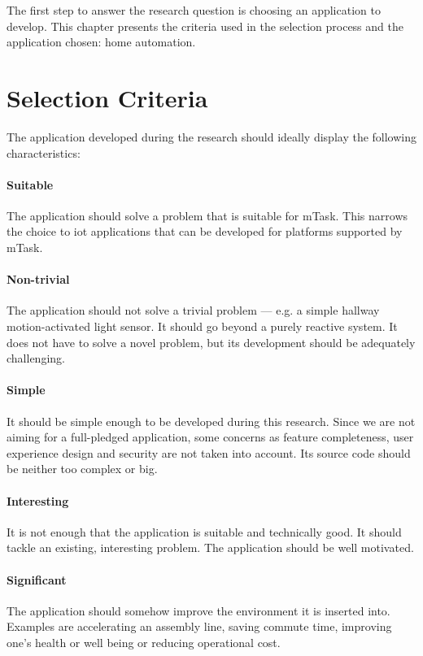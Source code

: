 The first step to answer the research question is choosing an application to develop. This chapter presents the criteria used in the selection process and the application chosen: home automation.

\section{Selection Criteria}\label{sec:selec_cri}

The application developed during the research should ideally display the following characteristics:

\paragraph{Suitable} The application should solve a problem that is suitable for mTask. This narrows the choice to \ac{iot} applications that can be developed for platforms supported by mTask.

\paragraph{Non-trivial} The application should not solve a trivial problem --- e.g. a simple hallway  motion-activated light sensor. It should go beyond a purely reactive system. It does not have to solve a novel problem, but its development should be adequately challenging.

\paragraph{Simple} It should be simple enough to be developed during this research. Since we are not aiming for a full-pledged application, some concerns as feature completeness, user experience design and security are not taken into account. Its source code should be neither too complex or big.

\paragraph{Interesting} It is not enough that the application is suitable and technically good. It should tackle an existing, interesting problem. The application should be well motivated.

\paragraph{Significant} The application should somehow improve the environment it is inserted into. Examples are accelerating an assembly line, saving commute  time, improving one's health or well being or reducing operational cost.

